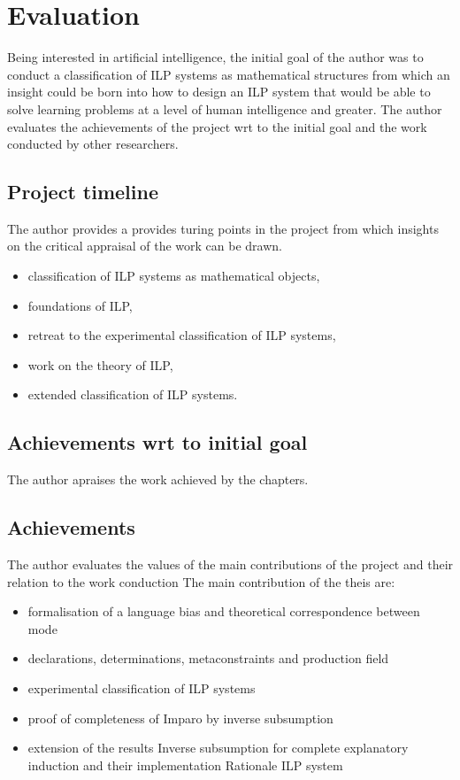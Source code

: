 \chapter{Evaluation}
Being interested in artificial intelligence, the initial goal of the author was to conduct a classification of ILP systems as mathematical structures from which an insight could be born into how to design an ILP system that would be able to solve learning problems at a level of human intelligence and greater. The author evaluates the achievements of the project wrt to the initial goal and the work conducted by other researchers.

\section{Project timeline}
The author provides a provides turing points in the project from which insights on the critical appraisal of the work can be drawn.

\begin{itemize}
\item classification of ILP systems as mathematical objects,
\item foundations of ILP,
\item retreat to the experimental classification of ILP systems,
\item work on the theory of ILP,
\item extended classification of ILP systems.
\end{itemize}

\section{Achievements wrt to initial goal}
The author apraises the work achieved by the chapters.

\section{Achievements}
The author evaluates the values of the main contributions of the project and their relation to the work conduction
The main contribution of the theis are:
\begin{itemize}
\item formalisation of a language bias and theoretical correspondence between mode \item declarations, determinations, metaconstraints and production field
\item experimental classification of ILP systems
\item proof of completeness of Imparo by inverse subsumption
\item extension of the results Inverse subsumption for complete explanatory induction and their implementation Rationale ILP system
\end{itemize}